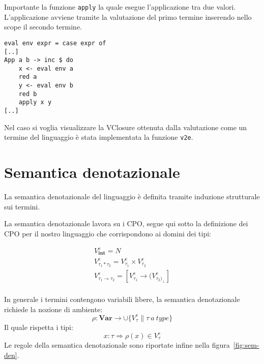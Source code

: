 \documentclass{article}
\begin{document}
Importante la funzione \texttt{apply} la quale esegue l'applicazione tra due valori. L'applicazione avviene tramite la valutazione del primo termine inserendo nello scope il secondo termine.

\begin{verbatim}
eval env expr = case expr of
[..]
App a b -> inc $ do
    x <- eval env a
    red a
    y <- eval env b
    red b
    apply x y
[..]
\end{verbatim}

Nel caso si voglia visualizzare la VClosure ottenuta dalla valutazione come un termine del linguaggio è stata implementata la funzione \texttt{v2e}.



\section{Semantica denotazionale}
\label{sec:denotational}
La semantica denotazionale del linguaggio è definita tramite induzione strutturale sui termini.

La semantica denotazionale lavora su i CPO, segue qui sotto la definizione dei CPO per il nostro linguaggio che corrispondono ai domini dei tipi:

\begin{gather*}
V^{e}_{\mathbf{int}} = N
\\
V^{e}_{\tau_{1} * \tau_{2}} = V^{e}_{\tau_{1}} \times V^{e}_{\tau_{2}}
\\
V^{e}_{\tau_{1} \rightarrow \tau_{2}} = [V^{e}_{\tau_{1}} \rightarrow (V^{e}_{\tau_{2})_{\perp}}]
\\
\end{gather*}

In generale i termini contengono variabili libere, la semantica denotazionale richiede la nozione di ambiente:
$$
\rho : \mathbf{Var} \rightarrow \cup \{ V^{e}_\tau \| \tau \ a \ type \}
$$
Il quale rispetta i tipi:
$$
x : \tau \Rightarrow \rho ( x ) \in V^{e}_{\tau}
$$
Le regole della semantica denotazionale sono riportate infine nella figura~\ref{fig:sem-den}.
\end{document}
